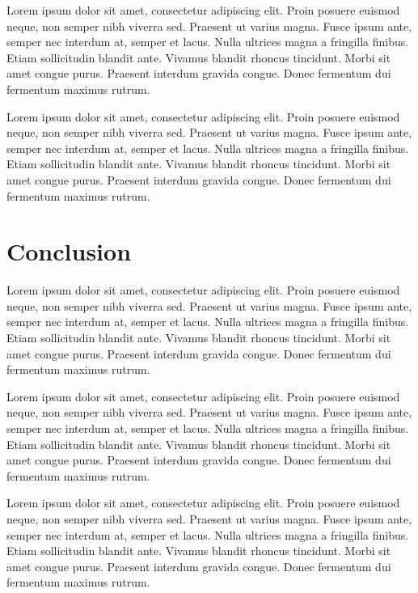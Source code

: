 \medskip

Lorem ipsum dolor sit amet, consectetur adipiscing elit. Proin posuere euismod neque, non semper nibh viverra sed. Praesent ut varius magna. Fusce ipsum ante, semper nec interdum at, semper et lacus. Nulla ultrices magna a fringilla finibus. Etiam sollicitudin blandit ante. Vivamus blandit rhoncus tincidunt. Morbi sit amet congue purus. Praesent interdum gravida congue. Donec fermentum dui fermentum maximus rutrum.

\medskip

Lorem ipsum dolor sit amet, consectetur adipiscing elit. Proin posuere euismod neque, non semper nibh viverra sed. Praesent ut varius magna. Fusce ipsum ante, semper nec interdum at, semper et lacus. Nulla ultrices magna a fringilla finibus. Etiam sollicitudin blandit ante. Vivamus blandit rhoncus tincidunt. Morbi sit amet congue purus. Praesent interdum gravida congue. Donec fermentum dui fermentum maximus rutrum.


\medskip

\section{Conclusion}

Lorem ipsum dolor sit amet, consectetur adipiscing elit. Proin posuere euismod neque, non semper nibh viverra sed. Praesent ut varius magna. Fusce ipsum ante, semper nec interdum at, semper et lacus. Nulla ultrices magna a fringilla finibus. Etiam sollicitudin blandit ante. Vivamus blandit rhoncus tincidunt. Morbi sit amet congue purus. Praesent interdum gravida congue. Donec fermentum dui fermentum maximus rutrum.

Lorem ipsum dolor sit amet, consectetur adipiscing elit. Proin posuere euismod neque, non semper nibh viverra sed. Praesent ut varius magna. Fusce ipsum ante, semper nec interdum at, semper et lacus. Nulla ultrices magna a fringilla finibus. Etiam sollicitudin blandit ante. Vivamus blandit rhoncus tincidunt. Morbi sit amet congue purus. Praesent interdum gravida congue. Donec fermentum dui fermentum maximus rutrum.

Lorem ipsum dolor sit amet, consectetur adipiscing elit. Proin posuere euismod neque, non semper nibh viverra sed. Praesent ut varius magna. Fusce ipsum ante, semper nec interdum at, semper et lacus. Nulla ultrices magna a fringilla finibus. Etiam sollicitudin blandit ante. Vivamus blandit rhoncus tincidunt. Morbi sit amet congue purus. Praesent interdum gravida congue. Donec fermentum dui fermentum maximus rutrum.


